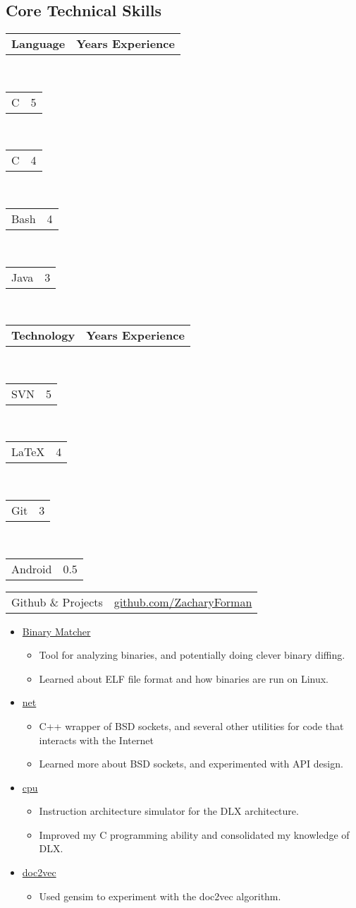 \documentclass[10pt,letterpaper]{article}
\makeatletter
\newenvironment{indentsection}[1]%
{\begin{list}{}%
  {\setlength{\leftmargin}{#1}}%
  \item[]%
}
{\end{list}}
\newcommand{\headerrow}[2]
{\begin{tabular*}{\linewidth}{l@{\extracolsep{\fill}}r}
  #1 &
  #2 \\
\end{tabular*}}
\newcommand{\CPP}
{C\nolinebreak[4]\hspace{-.05em}\raisebox{.22ex}{\footnotesize\bf ++}}
\makeatother
\begin{document}
\subsection*{Core Technical Skills}

\begin{indentsection}{\parindent}
\begin{multicols}{2}
  \headerrow {\textbf{Language}} {\textbf{Years Experience}}\\
  \headerrow {\CPP} {5}\\
  \headerrow {C} {4}\\
  \headerrow {Bash} {4}\\
  \headerrow {Java} {3}\\
  \headerrow {\textbf{Technology}} {\textbf{Years Experience}}\\
  \headerrow {SVN} {5}\\
  \headerrow {\LaTeX} {4}\\
  \headerrow {Git} {3}\\
  \headerrow {Android} {0.5}
\end{multicols}
\end{indentsection}

\headerrow
  {Github \& Projects}
  {\href{https://www.github.com/ZacharyForman}{github.com/ZacharyForman}}
  \begin{itemize}
    \item \href{https://github.com/ZacharyForman/Binary_Matcher}{Binary Matcher}
      \begin{itemize}
        \item Tool for analyzing binaries, and potentially doing clever
              binary diffing.
        \item Learned about ELF file format and how binaries are run on Linux.
      \end{itemize}
    \item \href{https://github.com/ZacharyForman/net}{net}
      \begin{itemize}
        \item C++ wrapper of BSD sockets, and several other utilities for
              code that interacts with the Internet
        \item Learned more about BSD sockets, and experimented with API
              design.
      \end{itemize}
    \item \href{https://github.com/ZacharyForman/cpu}{cpu}
      \begin{itemize}
        \item Instruction architecture simulator for the DLX architecture.
        \item Improved my C programming ability and consolidated my knowledge
              of DLX.
      \end{itemize}
    \item \href{https://github.com/mbd-doc2vec-team/mbd-doc2vec}{doc2vec}
      \begin{itemize}
        \item Used gensim to experiment with the doc2vec algorithm.
      \end{itemize}
  \end{itemize}
\end{document}
